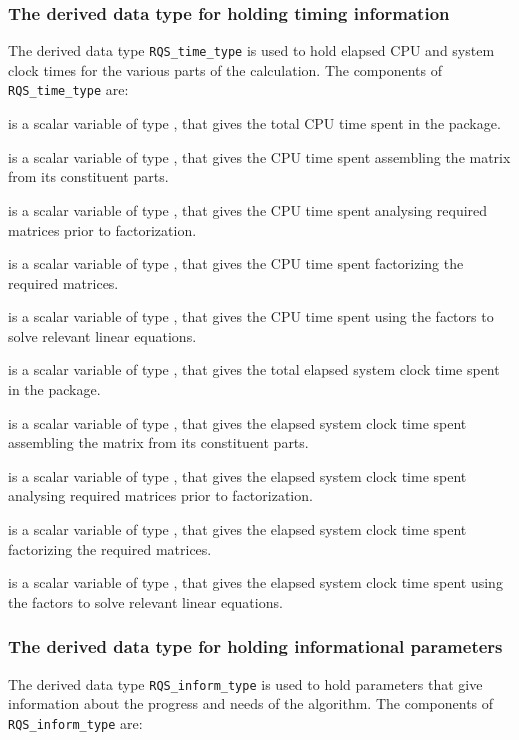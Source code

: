 \documentclass{galahad}
\newcommand{\packagename}{RQS}
\begin{document}
\subsubsection{The derived data type for holding timing
 information}\label{typetime}
The derived data type
{\tt \packagename\_time\_type}
is used to hold elapsed CPU and system clock times for the various parts of
the calculation. The components of
{\tt \packagename\_time\_type}
are:
\begin{description}
 is a scalar variable of type \realdp, that gives
 the total CPU time spent in the package.

 is a scalar variable of type \realdp, that gives
 the CPU time spent assembling the matrix  from its constituent parts.

 is a scalar variable of type \realdp, that gives
 the CPU time spent analysing required matrices prior to factorization.

 is a scalar variable of type \realdp, that gives
 the CPU time spent factorizing the required matrices.

 is a scalar variable of type \realdp, that gives
 the CPU time spent using the factors to solve relevant linear equations.

 is a scalar variable of type \realdp, that gives
 the total elapsed system clock time spent in the package.

 is a scalar variable of type \realdp, that gives
 the elapsed system clock time spent assembling the matrix  from
its constituent parts.

 is a scalar variable of type \realdp, that gives
 the elapsed system clock time spent analysing required matrices prior to
factorization.

 is a scalar variable of type \realdp, that gives
 the elapsed system clock time spent factorizing the required matrices.

 is a scalar variable of type \realdp, that gives
 the elapsed system clock time spent using the factors to solve relevant
linear equations.

\end{description}


\subsubsection{The derived data type for holding informational
 parameters}\label{typeinform}
The derived data type
{\tt \packagename\_inform\_type}
is used to hold parameters that give information about the progress and needs
of the algorithm. The components of
{\tt \packagename\_inform\_type}
are:
\end{document}
